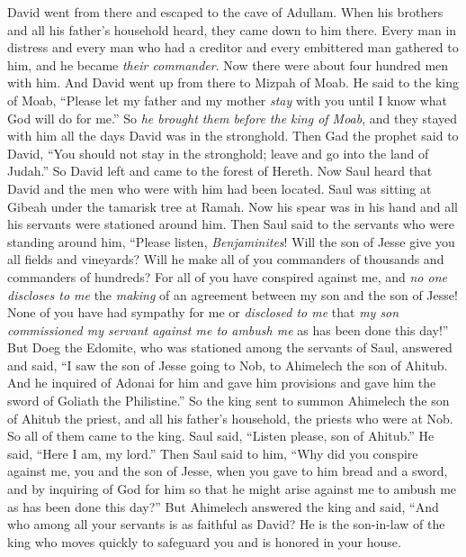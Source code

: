 \begin{biblechapter} %
 David went from there and escaped to the cave of Adullam. When his brothers and all his father’s household heard, they came down to him there.
\verse Every man in distress and every man who had a creditor and every embittered man gathered to him, and he became \textit{their commander}. Now there were about four hundred men with him.
\verse And David went up from there to Mizpah of Moab. He said to the king of Moab, “Please let my father and my mother \textit{stay} with you until I know what God will do for me.”
\verse So \textit{he brought them before the king of Moab}, and they stayed with him all the days David was in the stronghold.
\verse Then Gad the prophet said to David, “You should not stay in the stronghold; leave and go into the land of Judah.” So David left and came to the forest of Hereth.
\verse Now Saul heard that David and the men who were with him had been located. Saul was sitting at Gibeah under the tamarisk tree at Ramah. Now his spear was in his hand and all his servants were stationed around him.
\verse Then Saul said to the servants who were standing around him, “Please listen, \textit{Benjaminites}! Will the son of Jesse give you all fields and vineyards? Will he make all of you commanders of thousands and commanders of hundreds?
\verse For all of you have conspired against me, and \textit{no one discloses to me} the \textit{making} of an agreement between my son and the son of Jesse! None of you have had sympathy for me or \textit{disclosed to me} that \textit{my son commissioned my servant against me to ambush me} as has been done this day!”
\verse But Doeg the Edomite, who was stationed among the servants of Saul, answered and said, “I saw the son of Jesse going to Nob, to Ahimelech the son of Ahitub.
\verse And he inquired of Adonai for him and gave him provisions and gave him the sword of Goliath the Philistine.”
\verse So the king sent to summon Ahimelech the son of Ahitub the priest, and all his father’s household, the priests who were at Nob. So all of them came to the king.
\verse Saul said, “Listen please, son of Ahitub.” He said, “Here I am, my lord.”
\verse Then Saul said to him, “Why did you conspire against me, you and the son of Jesse, when you gave to him bread and a sword, and by inquiring of God for him so that he might arise against me to ambush me as has been done this day?”
\verse But Ahimelech answered the king and said, “And who among all your servants is as faithful as David? He is the son-in-law of the king who moves quickly to safeguard you and is honored in your house.

\end{biblechapter}
